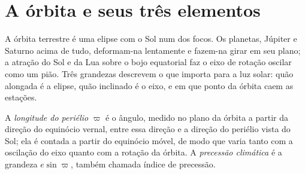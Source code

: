 \section{A órbita e seus três elementos}\label{sec:b2:orbital-forcing:elements}

A órbita terrestre é uma elipse com o Sol num dos focos. Os planetas, Júpiter e Saturno acima de
tudo, deformam-na lentamente e fazem-na girar em seu plano; a atração do Sol e da Lua sobre o bojo
equatorial faz o eixo de rotação oscilar como um pião. Três grandezas descrevem o que importa para a
luz solar: quão alongada é a elipse, quão inclinado é o eixo, e em que ponto da órbita caem as
estações.

\begin{definition}\label{def:b2:orbital-forcing:elements}
A \emph{longitude do periélio} $\varpi$ é o ângulo, medido no
plano da órbita a partir da direção do equinócio vernal, entre essa direção e a
direção do periélio vista do Sol; ela é contada a partir do equinócio móvel, de modo que
varia tanto com a oscilação do eixo quanto com a rotação da órbita. A \emph{precessão
climática} é a grandeza $e\sin\varpi$, também chamada índice de
precessão.
\end{definition}

